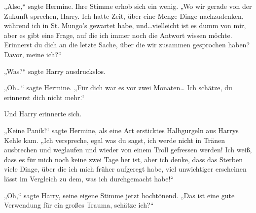 „Also,“ sagte Hermine. Ihre Stimme erhob sich ein wenig. „Wo wir gerade von der Zukunft sprechen, Harry. Ich hatte Zeit, über eine Menge Dinge nachzudenken, während ich in St. Mungo’s gewartet habe, und…vielleicht ist es dumm von mir, aber es gibt eine Frage, auf die ich immer noch die Antwort wissen möchte.
Erinnerst du dich an die letzte Sache, über die wir zusammen gesprochen haben? Davor, meine ich?“

„Was?“ sagte Harry ausdruckslos.

„Oh…“ sagte Hermine. „Für dich war es vor zwei Monaten… Ich schätze, du erinnerst dich nicht mehr.“

Und Harry erinnerte sich.

„Keine Panik!“ sagte Hermine, als eine Art ersticktes Halbgurgeln aus Harrys Kehle kam. „Ich verspreche, egal was du sagst, ich werde nicht in Tränen ausbrechen und weglaufen und wieder von einem Troll gefressen werden! Ich weiß, dass es für mich noch keine zwei Tage her ist, aber ich denke, dass das Sterben viele Dinge, über die ich mich früher aufgeregt habe, viel unwichtiger erscheinen lässt im Vergleich zu dem, was ich durchgemacht habe!“

„Oh,“ sagte Harry, seine eigene Stimme jetzt hochtönend. „Das ist eine gute Verwendung für ein großes Trauma, schätze ich?“

